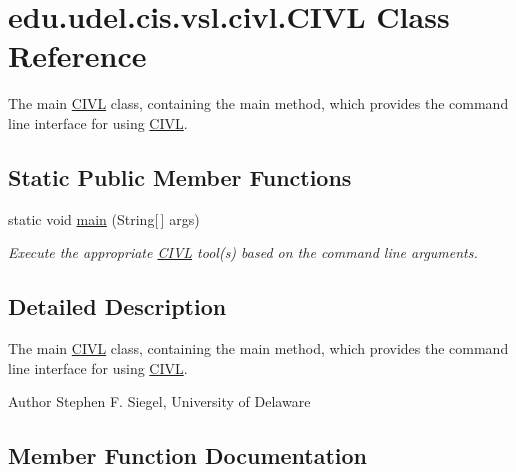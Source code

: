 \hypertarget{classedu_1_1udel_1_1cis_1_1vsl_1_1civl_1_1CIVL}{}\section{edu.\+udel.\+cis.\+vsl.\+civl.\+C\+I\+V\+L Class Reference}
\label{classedu_1_1udel_1_1cis_1_1vsl_1_1civl_1_1CIVL}


The main \hyperlink{classedu_1_1udel_1_1cis_1_1vsl_1_1civl_1_1CIVL}{C\+I\+V\+L} class, containing the main method, which provides the command line interface for using \hyperlink{classedu_1_1udel_1_1cis_1_1vsl_1_1civl_1_1CIVL}{C\+I\+V\+L}.  


\subsection*{Static Public Member Functions}
\begin{DoxyCompactItemize}
\item 
static void \hyperlink{classedu_1_1udel_1_1cis_1_1vsl_1_1civl_1_1CIVL_a237558cb2951c8396a5a5e0a0c7a5ff9}{main} (String\mbox{[}$\,$\mbox{]} args)
\begin{DoxyCompactList}\small\item\em Execute the appropriate \hyperlink{classedu_1_1udel_1_1cis_1_1vsl_1_1civl_1_1CIVL}{C\+I\+V\+L} tool(s) based on the command line arguments. \end{DoxyCompactList}\end{DoxyCompactItemize}


\subsection{Detailed Description}
The main \hyperlink{classedu_1_1udel_1_1cis_1_1vsl_1_1civl_1_1CIVL}{C\+I\+V\+L} class, containing the main method, which provides the command line interface for using \hyperlink{classedu_1_1udel_1_1cis_1_1vsl_1_1civl_1_1CIVL}{C\+I\+V\+L}. 

\begin{DoxyAuthor}{Author}
Stephen F. Siegel, University of Delaware 
\end{DoxyAuthor}


\subsection{Member Function Documentation}
\hypertarget{classedu_1_1udel_1_1cis_1_1vsl_1_1civl_1_1CIVL_a237558cb2951c8396a5a5e0a0c7a5ff9}{}
